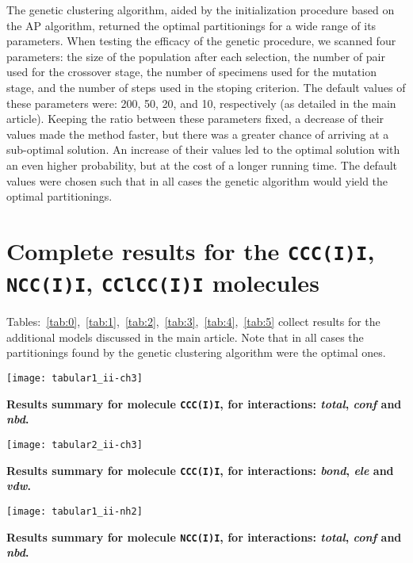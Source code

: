 \documentclass[a4paper,11pt,twoside]{book}%
\begin{document}
\begin{appendices}
The genetic clustering algorithm, aided by the initialization procedure based on the AP algorithm, returned the optimal partitionings for a wide range of its parameters.
When testing the efficacy of the genetic procedure, we scanned four parameters: the size of the population after each selection, the number of pair used for the crossover stage, the number of specimens used for the mutation stage, and the number of steps used in the stoping criterion.
The default values of these parameters were: 200, 50, 20, and 10, respectively (as detailed in the main article).
Keeping the ratio between these parameters fixed, a decrease of their values made the method faster, but there was a greater chance of arriving at a sub-optimal solution.
An increase of their values led to the optimal solution with an even higher probability, but at the cost of a longer running time.
The default values were chosen such that in all cases the genetic algorithm would yield the optimal partitionings.
  
\section{Complete results for the \texttt{CCC(I)I}, \texttt{NCC(I)I}, \texttt{CClCC(I)I} molecules}

Tables:~\ref{tab:0},~\ref{tab:1},~\ref{tab:2},~\ref{tab:3},~\ref{tab:4},~\ref{tab:5} collect results for the additional models discussed in the main article.
Note that in all cases the partitionings found by the genetic clustering algorithm were the optimal ones.

{
\centering
\begin{table}[h!]
\centering
\texttt{[image: tabular1\_ii-ch3]}
\caption{
{\bf Results summary for molecule \texttt{CCC(I)I}, for interactions: \emph{total}, \emph{conf} and \emph{nbd}.}
}
\label{tab:0}
\end{table}
}

{
\centering
\begin{table}
\centering
\texttt{[image: tabular2\_ii-ch3]}
\caption{
{\bf Results summary for molecule \texttt{CCC(I)I}, for interactions: \emph{bond}, \emph{ele} and \emph{vdw}.}
}
\label{tab:1}
\end{table}
}

{
\centering
\begin{table}
\centering
\texttt{[image: tabular1\_ii-nh2]}
\caption{
{\bf Results summary for molecule \texttt{NCC(I)I}, for interactions: \emph{total}, \emph{conf} and \emph{nbd}.}
}
\label{tab:2}
\end{table}
}


\end{appendices}
\end{document}
